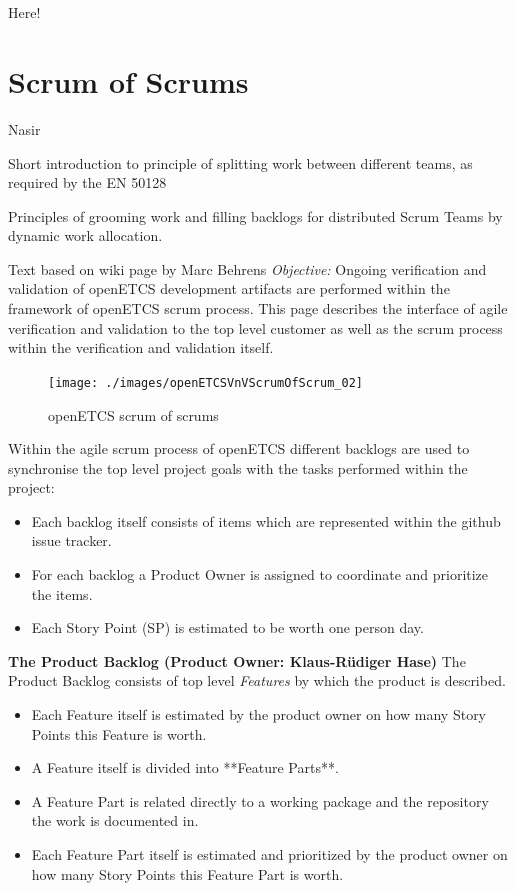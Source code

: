  \\ \\



Here!
\reversemarginpar
{}

\section{Scrum of Scrums}


Nasir

Short introduction to principle of splitting work between different teams, as required by the EN 50128

Principles of grooming work and filling backlogs for distributed Scrum Teams by dynamic work allocation.

Text based on wiki page by Marc Behrens
\textit{Objective:} Ongoing verification and validation of openETCS development artifacts are performed within the framework of openETCS scrum process. This page describes the interface of agile verification and validation to the top level customer as well as the scrum process within the verification and validation itself.

\begin{figure}[h]
\centering
\texttt{[image: ./images/openETCSVnVScrumOfScrum\_02]}
\caption{openETCS scrum of scrums}
\label{fig:openETCSVnVScrumOfScrum}
\end{figure}

Within the agile scrum process of openETCS different backlogs are used to synchronise the top level project goals with the tasks performed within the project: 

\begin{itemize}
\item Each backlog itself consists of items which are represented within the github issue tracker. 
\item For each backlog a Product Owner is assigned to coordinate and prioritize the items.
\item Each Story Point (SP) is estimated to be worth one person day.
\end{itemize}


\textbf{The Product Backlog (Product Owner: Klaus-Rüdiger Hase)}
The Product Backlog consists of top level \textit{Features} by which the product is described.
\begin{itemize}
\item  Each Feature itself is estimated by the product owner on how many Story Points this Feature is worth.
\item  A Feature itself is divided into **Feature Parts**.
\item  A Feature Part is related directly to a working package and the repository the work is documented in.
\item  Each Feature Part itself is estimated and prioritized by the product owner on how many Story Points this Feature Part is worth.
\end{itemize}


